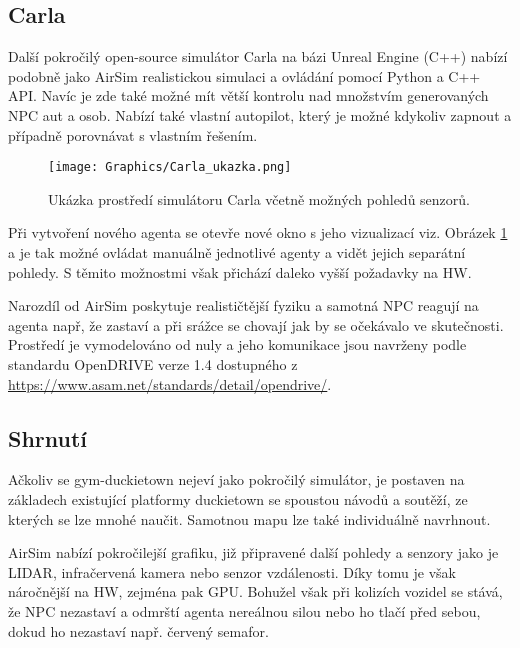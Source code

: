 \documentclass[czech, bc, kky, he, iso690numb]{fasthesis}
\begin{document}
	    	\subsection{Carla}
	    		Další pokročilý open-source simulátor Carla na bázi Unreal Engine (C++) nabízí podobně jako AirSim realistickou simulaci a ovládání pomocí Python a C++ API. Navíc je zde také možné mít větší kontrolu nad množstvím generovaných NPC aut a osob. Nabízí také vlastní autopilot, který je možné kdykoliv zapnout a případně porovnávat s vlastním řešením.
	    		
		    		\begin{figure}[h]
		    			\centering
		    			\texttt{[image: Graphics/Carla\_ukazka.png]}
		    			\caption{Ukázka prostředí simulátoru Carla včetně možných pohledů senzorů.}
		    			\label{pic:Carla_ukazka}
		    		\end{figure}
	    		
	    		Při vytvoření nového agenta se otevře nové okno s jeho vizualizací viz. Obrázek \ref{pic:Carla_ukazka} a je tak možné ovládat manuálně jednotlivé agenty a vidět jejich separátní pohledy. S těmito možnostmi však přichází daleko vyšší požadavky na HW.
	    		
	    		Narozdíl od AirSim poskytuje realističtější fyziku a samotná NPC reagují na agenta např, že zastaví a při srážce se chovají jak by se očekávalo ve skutečnosti. Prostředí je vymodelováno od nuly a jeho komunikace jsou navrženy podle standardu OpenDRIVE\textsuperscript{\textregistered} verze 1.4 dostupného z \href{https://www.asam.net/standards/detail/opendrive/}{https://www.asam.net/standards/detail/opendrive/}.
	    		
	    	\subsection{Shrnutí}
	    		Ačkoliv se gym-duckietown nejeví jako pokročilý simulátor, je postaven na základech existující platformy duckietown se spoustou návodů a soutěží, ze kterých se lze mnohé naučit. Samotnou mapu lze také individuálně navrhnout.
	    		
	    		AirSim nabízí pokročilejší grafiku, již připravené další pohledy a senzory jako je LIDAR, infračervená kamera nebo senzor vzdálenosti. Díky tomu je však náročnější na HW, zejména pak GPU. Bohužel však při kolizích vozidel se stává, že NPC nezastaví a odmrští agenta nereálnou silou nebo ho tlačí před sebou, dokud ho nezastaví např. červený semafor.
	    		
\end{document}
